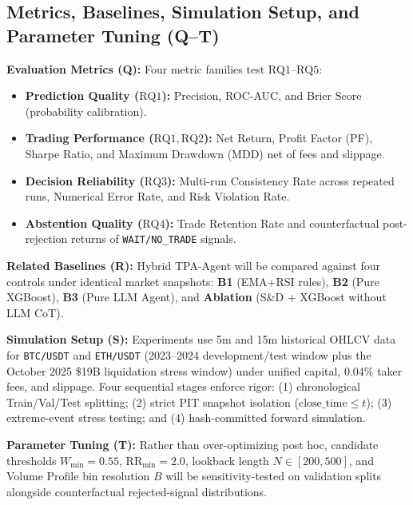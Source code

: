 \documentclass[conference]{IEEEtran}
\begin{document}
\subsection{Metrics, Baselines, Simulation Setup, and Parameter Tuning (Q--T)}
\textbf{Evaluation Metrics (Q):} Four metric families test $\mathrm{RQ1}$--$\mathrm{RQ5}$:
\begin{itemize}
    \item \textbf{Prediction Quality ($\mathrm{RQ1}$):} Precision, ROC-AUC, and Brier Score (probability calibration).
    \item \textbf{Trading Performance ($\mathrm{RQ1, RQ2}$):} Net Return, Profit Factor (PF), Sharpe Ratio, and Maximum Drawdown (MDD) net of fees and slippage.
    \item \textbf{Decision Reliability ($\mathrm{RQ3}$):} Multi-run Consistency Rate across repeated runs, Numerical Error Rate, and Risk Violation Rate.
    \item \textbf{Abstention Quality ($\mathrm{RQ4}$):} Trade Retention Rate and counterfactual post-rejection returns of \texttt{WAIT/NO\_TRADE} signals.
\end{itemize}

\textbf{Related Baselines (R):} Hybrid TPA-Agent will be compared against four controls under identical market snapshots: \textbf{B1} (EMA+RSI rules), \textbf{B2} (Pure XGBoost), \textbf{B3} (Pure LLM Agent), and \textbf{Ablation} (S\&D + XGBoost without LLM CoT).

\textbf{Simulation Setup (S):} Experiments use 5m and 15m historical OHLCV data for \texttt{BTC/USDT} and \texttt{ETH/USDT} (2023--2024 development/test window plus the October 2025 \$19B liquidation stress window) under unified capital, 0.04\% taker fees, and slippage. Four sequential stages enforce rigor: (1) chronological Train/Val/Test splitting; (2) strict PIT snapshot isolation ($\text{close\_time} \le t$); (3) extreme-event stress testing; and (4) hash-committed forward simulation.

\textbf{Parameter Tuning (T):} Rather than over-optimizing post hoc, candidate thresholds $W_{\min} = 0.55$, $\mathrm{RR}_{\min} = 2.0$, lookback length $N \in [200, 500]$, and Volume Profile bin resolution $B$ will be sensitivity-tested on validation splits alongside counterfactual rejected-signal distributions.

\end{document}
